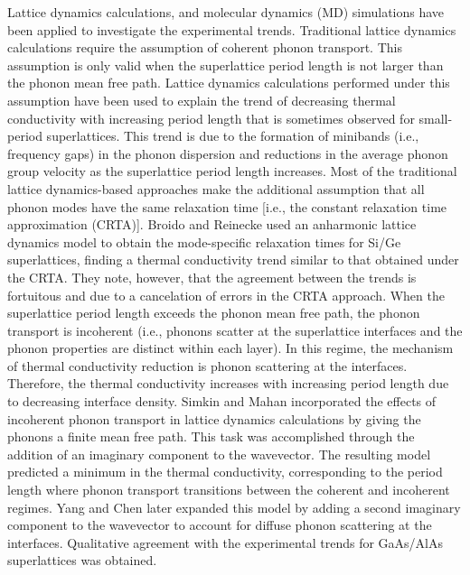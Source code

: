 \documentclass[letterpaper,12pt]{article}
\begin{document}
Lattice dynamics calculations,
\cite{simkin2000,yang2003,broido2004,yang2001,ren2006,tamura1999,kiselev2000,hyldgaard1997,bies2000}
and molecular dynamics (MD) simulations
\cite{abramson2002,chen2005,daly2002,imamura2003,volz2000,mcgaughey2006,chiritescu2007}
have been applied to investigate the experimental trends.
Traditional lattice dynamics calculations require the assumption of
coherent phonon transport. This assumption is only valid when the
superlattice period length is not larger than the phonon mean free
path. Lattice dynamics calculations performed under this assumption
have been used to explain the trend of decreasing thermal
conductivity with increasing period length that is sometimes
observed for small-period
superlattices.\cite{kiselev2000,tamura1999,yang2001,bies2000} This
trend is due to the formation of minibands (i.e., frequency gaps) in
the phonon dispersion and reductions in the average phonon group
velocity as the superlattice period length increases. Most of the
traditional lattice dynamics-based approaches make the additional
assumption that all phonon modes have the same relaxation time
[i.e., the constant relaxation time approximation
(CRTA)].\cite{yang2001,ren2006,tamura1999,kiselev2000,hyldgaard1997,bies2000}
Broido and Reinecke \cite{broido2004} used an anharmonic lattice
dynamics model to obtain the mode-specific relaxation times for
Si/Ge superlattices, finding a thermal conductivity trend similar to
that obtained under the CRTA. They note, however, that the agreement
between the trends is fortuitous and due to a cancelation of errors
in the CRTA approach. When the superlattice period length exceeds
the phonon mean free path, the phonon transport is incoherent (i.e.,
phonons scatter at the superlattice interfaces and the phonon
properties are distinct within each layer). In this regime, the
mechanism of thermal conductivity reduction is phonon scattering at
the interfaces. Therefore, the thermal conductivity increases with
increasing period length due to decreasing interface density. Simkin
and Mahan \cite{simkin2000} incorporated the effects of incoherent
phonon transport in lattice dynamics calculations by giving the
phonons a finite mean free path. This task was accomplished through
the addition of an imaginary component to the wavevector. The
resulting model predicted a minimum in the thermal conductivity,
corresponding to the period length where phonon transport
transitions between the coherent and incoherent regimes. Yang and
Chen \cite{yang2003} later expanded this model by adding a second
imaginary component to the wavevector to account for diffuse phonon
scattering at the interfaces. Qualitative agreement with the
experimental trends for GaAs/AlAs superlattices was obtained.
\end{document}
